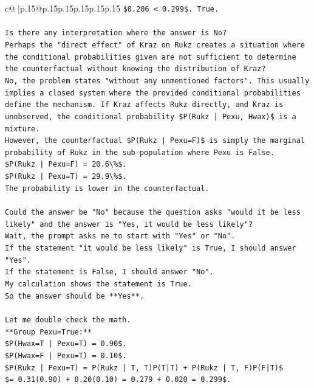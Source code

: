 \documentclass{article}
\begin{document}
{\begin{supertabular}{c@{$\;$}|p{.15\linewidth}@{}p{.15\linewidth}p{.15\linewidth}p{.15\linewidth}p{.15\linewidth}p{.15\linewidth}}
{{{\texttt{\$0.206 < 0.299\$. True.} \\
\\ 
\texttt{Is there any interpretation where the answer is No?} \\
\texttt{Perhaps the "direct effect" of Kraz on Rukz creates a situation where the conditional probabilities given are not sufficient to determine the counterfactual without knowing the distribution of Kraz?} \\
\texttt{No, the problem states "without any unmentioned factors". This usually implies a closed system where the provided conditional probabilities define the mechanism. If Kraz affects Rukz directly, and Kraz is unobserved, the conditional probability \$P(Rukz | Pexu, Hwax)\$ is a mixture.} \\
\texttt{However, the counterfactual \$P(Rukz | Pexu=F)\$ is simply the marginal probability of Rukz in the sub{-}population where Pexu is False.} \\
\texttt{\$P(Rukz | Pexu=F) = 20.6\textbackslash{}\%\$.} \\
\texttt{\$P(Rukz | Pexu=T) = 29.9\textbackslash{}\%\$.} \\
\texttt{The probability is lower in the counterfactual.} \\
\\ 
\texttt{Could the answer be "No" because the question asks "would it be less likely" and the answer is "Yes, it would be less likely"?} \\
\texttt{Wait, the prompt asks me to start with "Yes" or "No".} \\
\texttt{If the statement "it would be less likely" is True, I should answer "Yes".} \\
\texttt{If the statement is False, I should answer "No".} \\
\texttt{My calculation shows the statement is True.} \\
\texttt{So the answer should be **Yes**.} \\
\\ 
\texttt{Let me double check the math.} \\
\texttt{**Group Pexu=True:**} \\
\texttt{\$P(Hwax=T | Pexu=T) = 0.90\$.} \\
\texttt{\$P(Hwax=F | Pexu=T) = 0.10\$.} \\
\texttt{\$P(Rukz | Pexu=T) = P(Rukz | T, T)P(T|T) + P(Rukz | T, F)P(F|T)\$} \\
\texttt{\$= 0.31(0.90) + 0.20(0.10) = 0.279 + 0.020 = 0.299\$.} \\
}}}
\end{supertabular}}
\end{document}
